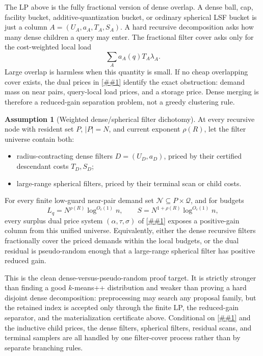 \documentclass[10pt]{article}
\newcommand{\cref}[1]{\ref{##1}}
\theoremstyle{definition}
\newtheorem{assumption}[theorem]{Assumption}
\begin{document}
The LP above is the fully fractional version of dense overlap.  A dense ball,
cap, facility bucket, additive-quantization bucket, or ordinary spherical LSF
bucket is just a column \(A=(U_A,a_A,T_A,S_A)\).  A hard recursive decomposition
asks how many dense children a query may enter.  The fractional filter cover asks
only for the cost-weighted local load
\[
   \sum_A a_A(q)T_A\lambda_A .
\]
Large overlap is harmless when this quantity is small.  If no cheap overlapping
cover exists, the dual prices in \cref{lem:finite-filter-cover-dual} identify the
exact obstruction: demand mass on near pairs, query-local load prices, and a
storage price.  Dense merging is therefore a reduced-gain separation problem,
not a greedy clustering rule.

\begin{assumption}[Weighted dense/spherical filter dichotomy]
   \label{asm:weighted-dense-spherical-dichotomy}
   At every recursive node with resident set \(P\), \(|P|=N\), and current
   exponent \(\rho(R)\), let the filter universe contain both:
   \begin{itemize}
      \item radius-contracting dense filters \(D=(U_D,a_D)\), priced by their
      certified descendant costs \(T_D,S_D\);
      \item large-range spherical filters, priced by their terminal scan or
      child costs.
   \end{itemize}
   For every finite low-guard near-pair demand set
   \(\mathcal N\subseteq P\times\mathcal Q\), and for budgets
   \[
      L_q=N^{\rho(R)}\log^{O_c(1)}n,
      \qquad
      S=N^{1+\rho(R)}\log^{O_c(1)}n,
   \]
   every surplus dual price system \((\alpha,\tau,\sigma)\) of
   \cref{lem:finite-filter-cover-dual} exposes a positive-gain column from this
   unified universe.  Equivalently, either the dense recursive filters
   fractionally cover the priced demands within the local budgets, or the dual
   residual is pseudo-random enough that a large-range spherical filter has
   positive reduced gain.
\end{assumption}

This is the clean dense-versus-pseudo-random proof target.  It is strictly
stronger than finding a good \(k\)-means++ distribution and weaker than proving a
hard disjoint dense decomposition: preprocessing may search any proposal family,
but the retained index is accepted only through the finite LP, the reduced-gain
separator, and the materialization certificate above.  Conditional on
\cref{asm:weighted-dense-spherical-dichotomy} and the inductive child prices, the
dense filters, spherical filters, residual scans, and terminal samplers are all
handled by one filter-cover process rather than by separate branching rules.
\end{document}
